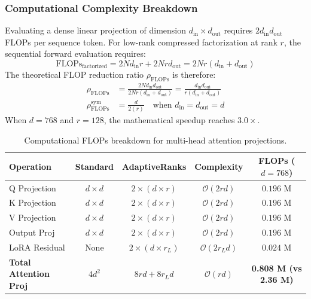 \subsubsection{Computational Complexity Breakdown}
Evaluating a dense linear projection of dimension $d_{\text{in}} \times d_{\text{out}}$ requires $2 d_{\text{in}} d_{\text{out}}$ FLOPs per sequence token. For low-rank compressed factorization at rank $r$, the sequential forward evaluation requires:
\[
\text{FLOPs}_{\text{factorized}} = 2 N d_{\text{in}} r + 2 N r d_{\text{out}} = 2 N r (d_{\text{in}} + d_{\text{out}})
\]
The theoretical FLOP reduction ratio $\rho_{\text{FLOPs}}$ is therefore:
\begin{align}
\rho_{\text{FLOPs}} &= \frac{2 N d_{\text{in}} d_{\text{out}}}{2 N r (d_{\text{in}} + d_{\text{out}})} = \frac{d_{\text{in}} d_{\text{out}}}{r (d_{\text{in}} + d_{\text{out}})} \\
\rho_{\text{FLOPs}}^{\text{sym}} &= \frac{d}{2(r)} \quad \text{when } d_{\text{in}} = d_{\text{out}} = d
\end{align}
When $d = 768$ and $r = 128$, the mathematical speedup reaches $3.0\times$.

\begin{table}[H]
\centering
\small
\begin{tabular}{lcccc}
\toprule
\textbf{Operation} & \textbf{Standard} & \textbf{AdaptiveRanks} & \textbf{Complexity} & \textbf{FLOPs ($d=768$)} \\
\midrule
Q Projection & $d \times d$ & $2 \times (d \times r)$ & $\mathcal{O}(2rd)$ & $0.196$ M \\
K Projection & $d \times d$ & $2 \times (d \times r)$ & $\mathcal{O}(2rd)$ & $0.196$ M \\
V Projection & $d \times d$ & $2 \times (d \times r)$ & $\mathcal{O}(2rd)$ & $0.196$ M \\
Output Proj & $d \times d$ & $2 \times (d \times r)$ & $\mathcal{O}(2rd)$ & $0.196$ M \\
LoRA Residual & None & $2 \times (d \times r_L)$ & $\mathcal{O}(2r_L d)$ & $0.024$ M \\
\midrule
\textbf{Total Attention Proj} & $4 d^2$ & $8rd + 8r_L d$ & $\mathcal{O}(rd)$ & \textbf{0.808 M (vs 2.36 M)} \\
\bottomrule
\end{tabular}
\caption{Computational FLOPs breakdown for multi-head attention projections.}
\end{table}

